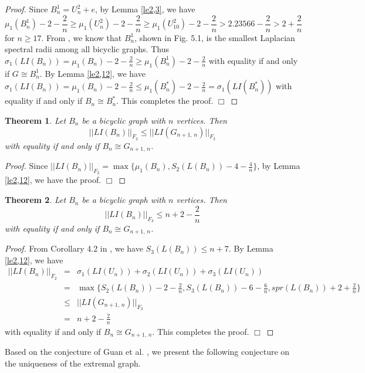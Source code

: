 \documentclass[12pt, a4paper]{article}
\newtheorem{theorem}{Theorem}[section]
\begin{document}
\begin{proof} Since $B_n^1=U_n^2+e$, by Lemma \ref{le2,3}, we have
$$\mu_1(B_n^1)-2-\frac{2}{n}\geq \mu_1(U_n^2)-2-\frac{2}{n}\geq \mu_1(U_{10}^2)-2-\frac{2}{n}> 2.23566-\frac{2}{n}>2+\frac{2}{n}$$
for $n\geq 17$. From \cite{SSG}, we know that $B_n^1$, shown in Fig. 5.1, is the smallest Laplacian spectral radii among all bicyclic graphs. Thus $\sigma_1(LI(B_n))=\mu_1(B_n)-2-\frac{2}{n}\geq \mu_1(B_n^1)-2-\frac{2}{n}$ with equality if and only if $G\cong B_n^1$. By Lemma \ref{le2,12}, we have
$\sigma_1(LI(B_n))=\mu_1(B_n)-2-\frac{2}{n}\leq \mu_1(B_n^{*})-2-\frac{2}{n}=\sigma_1(LI(B_n^{*}))$ with equality if and only if $B_n\cong B_n^{*}$.
This completes the proof. $\Box$
\end{proof}

\begin{theorem}\label{th5,8} %
Let $B_n$ be a bicyclic graph with $n$ vertices. Then
$$ ||LI(B_n)||_{F_2}\leq ||LI(G_{n+1,\,n})||_{F_2}$$
with  equality if and only if $B_n\cong G_{n+1,\,n}$.
\end{theorem}

\begin{proof}
Since $||LI(B_n)||_{F_2}=\max\{\mu_1(B_n), S_2(L(B_n))-4-\frac{4}{n} \}$, by Lemma \ref{le2,12}, we have the proof. $\Box$
\end{proof}

\begin{theorem}\label{th5,9} %
Let $B_n$ be a bicyclic graph with $n$ vertices. Then
$$ ||LI(B_n)||_{F_3}\leq n+2-\frac{2}{n}$$
with equality if and only if $B_n\cong G_{n+1,\,n}$.
\end{theorem}

\begin{proof} From Corollary 4.2 in \cite{DZ}, we have $S_3(L(B_n))\leq n+7$. By Lemma \ref{le2,12}, we have
\begin{eqnarray*}
||LI(B_n)||_{F_2} & = & \sigma_1(LI(U_n))+\sigma_2(LI(U_n))+\sigma_3(LI(U_n))\\
& = &  \max\{S_2(L(B_n))-2-\frac{2}{n}, S_3(L(B_n))-6-\frac{6}{n}, spr(L(B_n))+2+\frac{2}{n}\}\\
& \leq & ||LI(G_{n+1,\,n})||_{F_3}\\
& = & n+2-\frac{2}{n}
\end{eqnarray*}
with equality if and only if $B_n\cong G_{n+1,\,n}$.
This completes the proof. $\Box$
\end{proof}




Based on the conjecture of Guan et al. \cite{GZW}, we present the following conjecture on the uniqueness of the extremal graph.
\end{document}
